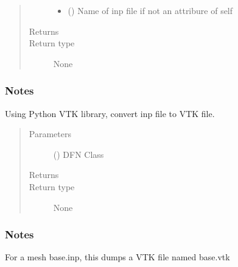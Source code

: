 \documentclass[letterpaper,10pt,english]{sphinxmanual}
\begin{document}
\begin{fulllineitems}
\begin{fulllineitems}
\begin{quote}
\begin{description}
\begin{itemize}
\item {} 
 () \textendash{} Name of inp file if not an attribure of self

\end{itemize}

\item[{Returns}] \leavevmode


\item[{Return type}] \leavevmode
None

\end{description}\end{quote}
\subsubsection*{Notes}

\end{fulllineitems}


\begin{fulllineitems}
\label{\detokenize{pydfnworks:pydfnworks.general.dfnworks.DFNWORKS.inp2vtk_python}}
Using Python VTK library, convert inp file to VTK file.
\begin{quote}\begin{description}
\item[{Parameters}] \leavevmode
{} () \textendash{} DFN Class

\item[{Returns}] \leavevmode


\item[{Return type}] \leavevmode
None

\end{description}\end{quote}
\subsubsection*{Notes}

For a mesh base.inp, this dumps a VTK file named base.vtk

\end{fulllineitems}


\end{fulllineitems}
\end{document}

